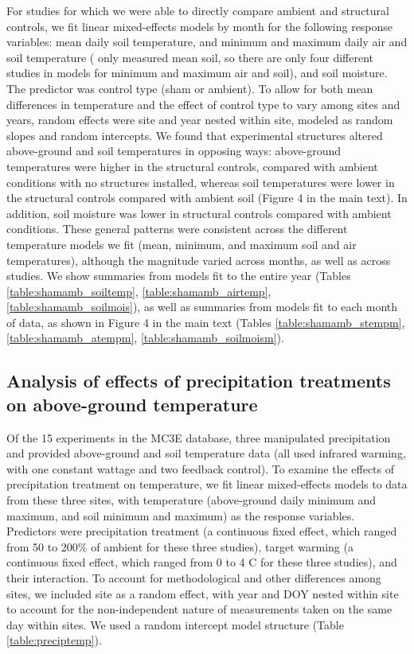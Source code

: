 \documentclass{article}
\begin{document}
\par For studies for which we were able to directly compare ambient and structural controls, we fit linear mixed-effects models by month for the following response variables: mean daily soil temperature, and minimum and maximum daily air and soil temperature (\citet{farnsworth1995} only measured mean soil, so there are only four different studies in models for minimum and maximum air and soil), and soil moisture. The predictor was control type (sham or ambient). To allow for both mean differences in temperature and the effect of control type to vary among sites and years, random effects were site and year nested within site, modeled as random slopes and random intercepts. 
We found that experimental structures altered above-ground and soil temperatures in opposing ways: above-ground temperatures were higher in the structural controls, compared with ambient conditions with no structures installed, whereas soil temperatures were lower in the structural controls compared with ambient soil (Figure 4 in the main text).  In addition, soil moisture was lower in structural controls compared with ambient conditions. These general patterns were consistent across the different temperature models we fit (mean, minimum, and maximum soil and air temperatures), although the magnitude varied across months, as well as across studies. We show summaries from models fit to the entire year (Tables \ref{table:shamamb_soiltemp}, \ref{table:shamamb_airtemp}, \ref{table:shamamb_soilmois}), as well as summaries from models fit to each month of data, as shown in Figure 4 in the main text (Tables \ref{table:shamamb_stempm}, \ref{table:shamamb_atempm}, \ref{table:shamamb_soilmoism}).


\subsection* {Analysis of effects of precipitation treatments on above-ground temperature}
Of the 15 experiments in the MC3E database, three manipulated precipitation and provided above-ground and soil temperature data (all used infrared warming, with one constant wattage and two feedback control). To examine the effects of precipitation treatment on temperature, we fit linear mixed-effects models to data from these three sites,  with temperature (above-ground daily minimum and maximum, and soil minimum and maximum) as the response variables. Predictors were precipitation treatment (a continuous fixed effect, which ranged from 50 to 200\% of ambient for these three studies), target warming (a continuous fixed effect, which ranged from 0 to 4 \degree C for these three studies), and their interaction. To account for methodological and other differences among sites, we included site as a random effect, with year and DOY nested within site to account for the non-independent nature of measurements taken on the same day within sites. We used a random intercept model structure (Table \ref{table:preciptemp}). 
\end{document}
